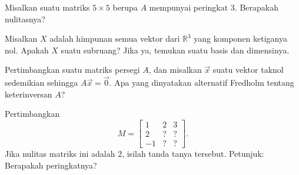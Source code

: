 \begin{exercise}
Misalkan suatu matriks $5 \times 5$ berupa $A$ mempunyai peringkat 3. Berapakah nulitasnya?
\end{exercise}

\begin{exercise}
Misalkan $X$ adalah himpunan semua vektor dari ${\mathbb{R}}^3$ yang
komponen ketiganya nol. Apakah $X$ suatu subruang? Jika ya, temukan suatu basis
dan dimensinya.
\end{exercise}

\begin{exercise}
Pertimbangkan suatu matriks persegi $A$, dan misalkan $\vec{x}$ suatu
vektor taknol sedemikian sehingga $A \vec{x} = \vec{0}$. Apa yang dinyatakan alternatif Fredholm
tentang keterinversan $A$?
\end{exercise}

\begin{exercise}
Pertimbangkan
\begin{equation*}
M =
\begin{bmatrix}
1 & 2 & 3 \\
2 & ? & ? \\
-1 & ? & ?
\end{bmatrix} .
\end{equation*}
Jika nulitas matriks ini adalah 2, isilah tanda tanya tersebut. Petunjuk: Berapakah
peringkatnya?
\end{exercise}

\setcounter{exercise}{100}

